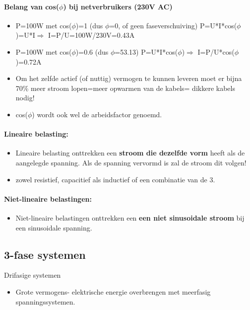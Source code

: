 \documentclass[12pt]{article}
\begin{document}
\paragraph{Belang van cos($\phi$) bij netverbruikers (230V AC)}
\begin{itemize}
    \item P=100W met cos($\phi$)=1 (dus $\phi$=0, of geen faseverschuiving)
    P=U*I*cos($\phi$)=U*I$\Rightarrow$ I=P/U=100W/230V=0.43A
    \item P=100W met cos($\phi$)=0.6 (dus $\phi$=53.13\textdegree)
    P=U*I*cos($\phi$)$\Rightarrow$ I=P/U*cos($\phi$)=0.72A
    \item Om het zelfde actief (of nuttig) vermogen te kunnen leveren moet er bijna 70\% meer stroom lopen=meer opwarmen van de kabels= dikkere kabels nodig!
    \item cos($\phi$) wordt ook wel de arbeidsfactor genoemd.
\end{itemize}
\paragraph{Lineaire belasting:}
\begin{itemize}
    \item Lineaire belasting onttrekken een \textbf{stroom die dezelfde vorm} heeft als de aangelegde spanning. Als de spanning vervormd is zal de stroom dit volgen!
    \item zowel resistief, capacitief als inductief of een combinatie van de 3.
\end{itemize}
\paragraph{Niet-lineaire belastingen:}
\begin{itemize}
    \item Niet-lineaire belastingen onttrekken een \textbf{een niet sinusoidale stroom} bij een sinusoidale spanning.
\end{itemize}
\subsection{3-fase systemen}
Drifasige systemen\begin{itemize}
    \item Grote vermogens- elektrische energie overbrengen met meerfasig spanningssystemen.
\end{itemize}
\end{document}

